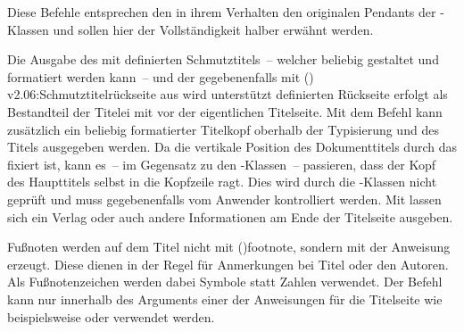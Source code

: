 \begin{DeclareEntity*}{}
\begin{DeclareEntity*}{}
\begin{DeclareEntity*}{}
\begin{Entity}{}
\begin{Declaration}
  {}
\begin{Declaration}
  {}
\begin{Declaration}
  {}
\begin{Declaration}
  {}
\begin{Declaration}
  {}
\begin{Declaration}
  {}
\begin{Declaration}
  {}
\begin{Declaration}
  {}
\printdeclarationlist

Diese Befehle entsprechen den in ihrem Verhalten den originalen Pendants der 
\KOMAScript-Klassen und sollen hier der Vollständigkeit halber erwähnt werden.

Die Ausgabe des mit  definierten Schmutztitels~-- welcher 
beliebig gestaltet und formatiert werden kann~-- und der gegebenenfalls mit 
(){%
  v2.06:Schmutztitelrückseite aus  wird unterstützt%
}%
 definierten Rückseite erfolgt als Bestandteil der Titelei 
mit  vor der eigentlichen Titelseite. Mit dem Befehl 
 kann zusätzlich ein beliebig formatierter Titelkopf oberhalb 
der Typisierung und des Titels ausgegeben werden. Da die vertikale Position des 
Dokumenttitels durch das \CD fixiert ist, kann es~-- im Gegensatz zu 
den \KOMAScript-Klassen~-- passieren, dass der Kopf des Haupttitels selbst in 
die Kopfzeile ragt. Dies wird durch die \TUDScript-Klassen nicht geprüft und 
muss gegebenenfalls vom Anwender kontrolliert werden. Mit  lassen 
sich ein Verlag oder auch andere Informationen am Ende der Titelseite ausgeben.

Fußnoten werden auf dem Titel nicht mit 
\Macro(){footnote}, 
sondern mit der Anweisung  erzeugt. Diese dienen in der Regel 
für Anmerkungen bei Titel oder den Autoren. Als Fußnotenzeichen werden dabei 
Symbole statt Zahlen verwendet. Der Befehl  kann nur innerhalb 
des Arguments einer der Anweisungen für die Titelseite wie beispielsweise 
 oder  verwendet werden.


\end{Declaration}
\end{Declaration}
\end{Declaration}
\end{Declaration}
\end{Declaration}
\end{Declaration}
\end{Declaration}
\end{Declaration}
\end{Entity}
\end{DeclareEntity*}
\end{DeclareEntity*}
\end{DeclareEntity*}
